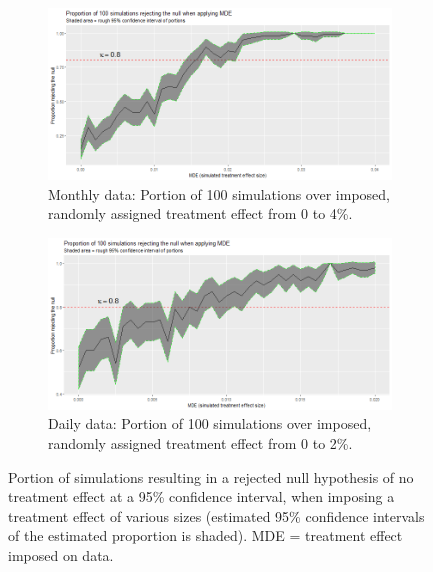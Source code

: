 \documentclass[12pt]{article}
\begin{document}
\def\widthfrac{0.8}
\begin{figure}[h!]
\centering
\begin{subfigure}{\widthfrac\textwidth}
    \centering
    \includegraphics[width=\textwidth]{"2-2_month_simulations_100_0-to-0.04"}
    \caption{Monthly data: Portion of 100 simulations over imposed, randomly assigned treatment effect from 0 to 4\%.}
    \label{fig2-2a}
  \end{subfigure}
\begin{subfigure}{\widthfrac\textwidth}
    \centering
    \includegraphics[width=\textwidth]{"2-2_day_simulations_100_0-to-0.02"}
    \caption{Daily data: Portion of 100 simulations over imposed, randomly assigned treatment effect from 0 to 2\%.}
    \label{fig2-2b}
  \end{subfigure}
\caption{Portion of simulations resulting in a rejected null hypothesis of no treatment effect at a 95\% confidence interval, when imposing a treatment effect of various sizes (estimated 95\% confidence intervals of the estimated proportion is shaded). MDE = treatment effect imposed on data.}
\label{fig2-2}
\end{figure}
\FloatBarrier
\end{document}
